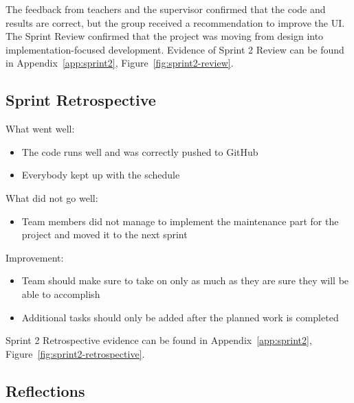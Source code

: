 The feedback from teachers and the supervisor confirmed that the code and results are correct, but the group received a recommendation to improve the UI. The Sprint Review confirmed that the project was moving from design into implementation-focused development. Evidence of Sprint 2 Review can be found in Appendix~\ref{app:sprint2}, Figure~\ref{fig:sprint2-review}.

 

\subsection*{Sprint Retrospective}

What went well:

\begin{itemize}

    \item The code runs well and was correctly pushed to GitHub

    \item Everybody kept up with the schedule 

\end{itemize}



What did not go well:

\begin{itemize}

    \item  Team members did not manage to implement the maintenance part for the project and moved it to the next sprint 

\end{itemize}



Improvement:

\begin{itemize}

    \item Team should make sure to take on only as much as they are sure they will be able to accomplish

    \item Additional tasks should only be added after the planned work is completed

\end{itemize}

Sprint 2 Retrospective evidence can be found in Appendix~\ref{app:sprint2}, Figure~\ref{fig:sprint2-retrospective}.

\subsection*{Reflections}


